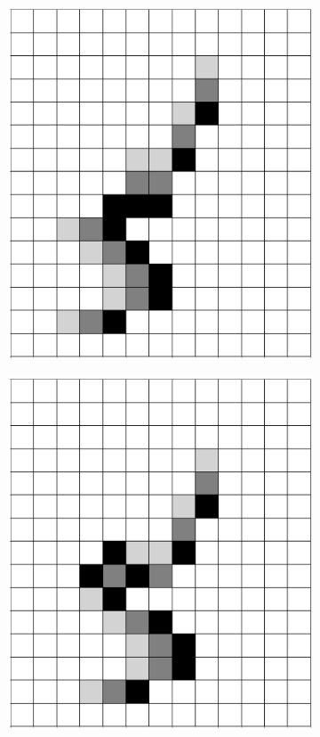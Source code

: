 \documentclass[12pt]{article}
\numberwithin{figure}{section} %
\begin{document}
\begin{figure}[H]
\begin{subfigure}{0.22\textwidth}
     		\includegraphics[width=\linewidth]{Section4/36.1}
     		\subcaption{}
   	\end{subfigure}
	\begin{subfigure}{0.22\textwidth}
     		\includegraphics[width=\linewidth]{Section4/36.2}

\end{subfigure}
\end{figure}
\end{document}
